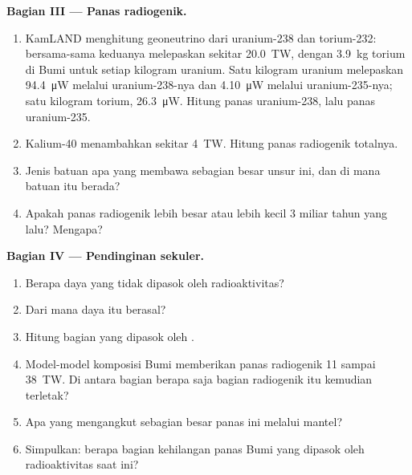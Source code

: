 \begin{problem}
\medskip
\noindent\textbf{Bagian III --- Panas radiogenik.}
\begin{enumerate}[resume]
  \item KamLAND menghitung geoneutrino dari uranium-238 dan torium-232:
        bersama-sama keduanya melepaskan sekitar \qty{20.0}{TW}, dengan
        \qty{3.9}{kg} torium di Bumi untuk setiap kilogram uranium. Satu
        kilogram uranium melepaskan \qty{94.4}{\micro W} melalui uranium-238-nya
        dan \qty{4.10}{\micro W} melalui uranium-235-nya; satu kilogram torium,
        \qty{26.3}{\micro W}. Hitung panas uranium-238, lalu panas uranium-235.
  \item Kalium-40 menambahkan sekitar \qty{4}{TW}. Hitung panas radiogenik
        totalnya.
  \item Jenis batuan apa yang membawa sebagian besar unsur ini, dan di mana
        batuan itu berada?
  \item Apakah panas radiogenik lebih besar atau lebih kecil 3 miliar tahun
        yang lalu? Mengapa?
\end{enumerate}

\medskip
\noindent\textbf{Bagian IV --- Pendinginan sekuler.}
\begin{enumerate}[resume]
  \item Berapa daya yang tidak dipasok oleh radioaktivitas?
  \item Dari mana daya itu berasal?
  \item Hitung bagian  yang dipasok oleh .
  \item Model-model komposisi Bumi memberikan panas radiogenik 11 sampai
        \qty{38}{TW}.
        Di antara bagian berapa saja bagian radiogenik itu kemudian terletak?
  \item Apa yang mengangkut sebagian besar panas ini melalui mantel?
  \item Simpulkan: berapa bagian kehilangan panas Bumi yang dipasok oleh
        radioaktivitas saat ini?
\end{enumerate}
\end{problem}
